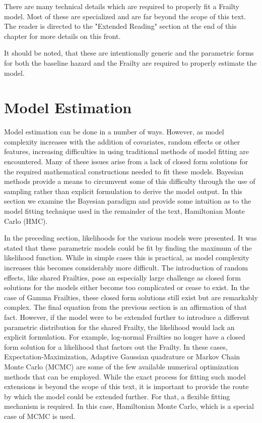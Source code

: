 




There are many technical details which are required to properly fit a Frailty model. Most of these are specialized and are far beyond the scope of this text. The reader is directed to the "Extended Reading" section at the end of this chapter for more details on this front.

It should be noted, that these are intentionally generic and the parametric forms for both the baseline hazard and the Frailty are required to properly estimate the model.




\section*{Model Estimation}

Model estimation can be done in a number of ways. However, as model complexity increases with the addition of covariates, random effects or other features, increasing difficulties in using traditional methods of model fitting are encountered. Many of these issues arise from a lack of closed form solutions for the required mathematical constructions needed to fit these models. Bayesian methods provide a means to circumvent some of this difficulty through the use of sampling rather than explicit formulation to derive the model output. In this section we examine the Bayesian paradigm and provide some intuition as to the model fitting technique used in the remainder of the text, Hamiltonian Monte Carlo (HMC).

In the preceding section, likelihoods for the various models were presented. It was stated that these parametric models could be fit by finding the maximum of the likelihood function. While in simple cases this is practical, as model complexity increases this becomes considerably more difficult. The introduction of random effects, like shared Frailties, pose an especially large challenge as closed form solutions for the models either become too complicated or cease to exist. In the case of Gamma Frailties, these closed form solutions still exist but are remarkably complex. The final equation from the previous section is an affirmation of that fact. However, if the model were to be extended further to introduce a different parametric distribution for the shared Frailty, the likelihood would lack an explicit formulation. For example, log-normal Frailties no longer have a closed form solution for a likelihood that factors out the Frailty. In these cases, Expectation-Maximization, Adaptive Gaussian quadrature or Markov Chain Monte Carlo (MCMC) are some of the few available numerical optimization methods that can be employed\cite{Wienke2010}. While the exact process for fitting such model extensions is beyond the scope of this text, it is important to provide the route by which the model could be extended further. For that, a flexible fitting mechanism is required. In this case, Hamiltonian Monte Carlo, which is a special case of MCMC is used. 

